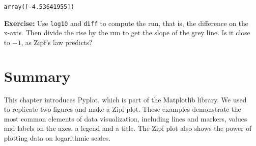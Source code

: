 \begin{lstlisting}[style=output]
array([-4.53641955])
\end{lstlisting}

\textbf{Exercise:} Use \passthrough{\lstinline!log10!} and
\passthrough{\lstinline!diff!} to compute the run, that is, the
difference on the x-axis. Then divide the rise by the run to get the
slope of the grey line. Is it close to \(-1\), as Zipf's law predicts?

\section{Summary}\label{summary}

This chapter introduces Pyplot, which is part of the Matplotlib library.
We used to replicate two figures and make a Zipf plot. These examples
demonstrate the most common elements of data visualization, including
lines and markers, values and labels on the axes, a legend and a title.
The Zipf plot also shows the power of plotting data on logarithmic
scales.

